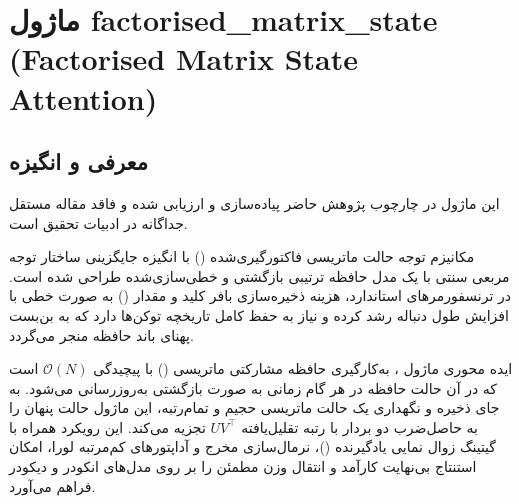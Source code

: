 \section{ماژول factorised\_matrix\_state (Factorised Matrix State Attention)}
\label{sec:module_factorised_matrix_state}

\subsection{معرفی و انگیزه}
این ماژول در چارچوب پژوهش حاضر پیاده‌سازی و ارزیابی شده و فاقد مقاله مستقل جداگانه در ادبیات تحقیق است.

مکانیزم توجه حالت ماتریسی فاکتورگیری‌شده () با انگیزه جایگزینی ساختار توجه مربعی سنتی با یک مدل حافظه ترتیبی بازگشتی و خطی‌سازی‌شده طراحی شده است. در ترنسفورمرهای استاندارد، هزینه ذخیره‌سازی بافر کلید و مقدار () به صورت خطی با افزایش طول دنباله رشد کرده و نیاز به حفظ کامل تاریخچه توکن‌ها دارد که به بن‌بست پهنای باند حافظه منجر می‌گردد.

ایده محوری ماژول ، به‌کارگیری حافظه مشارکتی ماتریسی () با پیچیدگی $\mathcal{O}(N)$ است که در آن حالت حافظه در هر گام زمانی به صورت بازگشتی به‌روزرسانی می‌شود. به جای ذخیره و نگهداری یک حالت ماتریسی حجیم و تمام‌رتبه، این ماژول حالت پنهان را به حاصل‌ضرب دو بردار با رتبه تقلیل‌یافته $U V^\top$ تجزیه می‌کند. این رویکرد همراه با گیتینگ زوال نمایی یادگیرنده ()، نرمال‌سازی مخرج و آداپتورهای کم‌مرتبه لورا، امکان استنتاج بی‌نهایت کارآمد و انتقال وزن مطمئن را بر روی مدل‌های انکودر و دیکودر فراهم می‌آورد.

